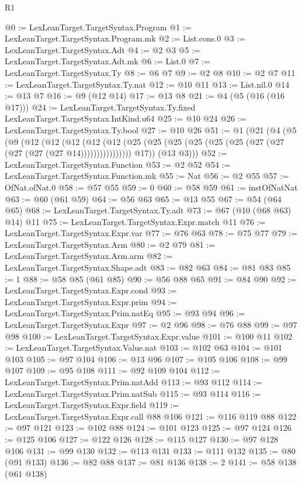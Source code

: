 \begin{lexlean}{R1}
\begin{coremodule}
@0 := LexLeanTarget.TargetSyntax.Program
@1 := LexLeanTarget.TargetSyntax.Program.mk
@2 := List.cons.{0}
@3 := LexLeanTarget.TargetSyntax.Adt
@4 := @2 @3
@5 := LexLeanTarget.TargetSyntax.Adt.mk
@6 := List.{0}
@7 := LexLeanTarget.TargetSyntax.Ty
@8 := @6 @7
@9 := @2 @8
@10 := @2 @7
@11 := LexLeanTarget.TargetSyntax.Ty.nat
@12 := @10 @11
@13 := List.nil.{0}
@14 := @13 @7
@16 := @9 (@12 @14)
@17 := @13 @8
@21 := @4 (@5 (@16 (@16 @17)))
@24 := LexLeanTarget.TargetSyntax.Ty.fixed LexLeanTarget.TargetSyntax.IntKind.u64
@25 := @10 @24
@26 := LexLeanTarget.TargetSyntax.Ty.bool
@27 := @10 @26
@51 := @1
    (@21
      (@4
        (@5
          (@9
            (@12
              (@12
                (@12
                  (@12
                    (@12 (@25 (@25 (@25 (@25 (@25 (@25 (@27 (@27 (@27 (@27 (@27 @14))))))))))))))))
            @17))
        (@13 @3)))
@52 := LexLeanTarget.TargetSyntax.Function
@53 := @2 @52
@54 := LexLeanTarget.TargetSyntax.Function.mk
@55 := Nat
@56 := @2 @55
@57 := OfNat.ofNat.{0}
@58 := @57 @55
@59 := 0
@60 := @58 @59
@61 := instOfNatNat
@63 := @60 (@61 @59)
@64 := @56 @63
@65 := @13 @55
@67 := @54 (@64 @65)
@68 := LexLeanTarget.TargetSyntax.Ty.adt
@73 := @67 (@10 (@68 @63) @14) @11
@75 := LexLeanTarget.TargetSyntax.Expr.match @11
@76 := LexLeanTarget.TargetSyntax.Expr.var
@77 := @76 @63
@78 := @75 @77
@79 := LexLeanTarget.TargetSyntax.Arm
@80 := @2 @79
@81 := LexLeanTarget.TargetSyntax.Arm.arm
@82 := LexLeanTarget.TargetSyntax.Shape.adt
@83 := @82 @63
@84 := @81 @83
@85 := 1
@88 := @58 @85 (@61 @85)
@90 := @56 @88 @65
@91 := @84 @90
@92 := LexLeanTarget.TargetSyntax.Expr.cond
@93 := LexLeanTarget.TargetSyntax.Expr.prim
@94 := LexLeanTarget.TargetSyntax.Prim.natEq
@95 := @93 @94
@96 := LexLeanTarget.TargetSyntax.Expr
@97 := @2 @96
@98 := @76 @88
@99 := @97 @98
@100 := LexLeanTarget.TargetSyntax.Expr.value
@101 := @100 @11
@102 := LexLeanTarget.TargetSyntax.Value.nat
@103 := @102 @63
@104 := @101 @103
@105 := @97 @104
@106 := @13 @96
@107 := @105 @106
@108 := @99 @107
@109 := @95 @108
@111 := @92 @109 @104
@112 := LexLeanTarget.TargetSyntax.Prim.natAdd
@113 := @93 @112
@114 := LexLeanTarget.TargetSyntax.Prim.natSub
@115 := @93 @114
@116 := LexLeanTarget.TargetSyntax.Expr.field
@119 := LexLeanTarget.TargetSyntax.Expr.call @88 @106
@121 := @116 @119 @88
@122 := @97 @121
@123 := @102 @88
@124 := @101 @123
@125 := @97 @124
@126 := @125 @106
@127 := @122 @126
@128 := @115 @127
@130 := @97 @128 @106
@131 := @99 @130
@132 := @113 @131
@133 := @111 @132
@135 := @80 (@91 @133)
@136 := @82 @88
@137 := @81 @136
@138 := 2
@141 := @58 @138 (@61 @138)

\end{coremodule}
\end{lexlean}
